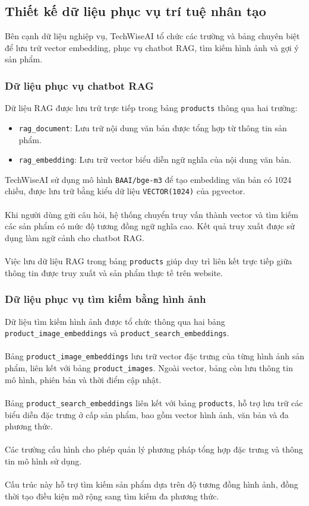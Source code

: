 \documentclass{report}
\begin{document}
\subsection{Thiết kế dữ liệu phục vụ trí tuệ nhân tạo}
Bên cạnh dữ liệu nghiệp vụ, TechWiseAI tổ chức các trường và bảng chuyên biệt để lưu trữ vector embedding, phục vụ chatbot RAG, tìm kiếm hình ảnh và gợi ý sản phẩm.

\subsubsection{Dữ liệu phục vụ chatbot RAG}
Dữ liệu RAG được lưu trữ trực tiếp trong bảng \texttt{products} thông qua hai trường:
\begin{itemize}
    \item \texttt{rag\_document}: Lưu trữ nội dung văn bản được tổng hợp từ thông tin sản phẩm.
    \item \texttt{rag\_embedding}: Lưu trữ vector biểu diễn ngữ nghĩa của nội dung văn bản.
\end{itemize}
TechWiseAI sử dụng mô hình \texttt{BAAI/bge-m3} để tạo embedding văn bản có 1024 chiều, được lưu trữ bằng kiểu dữ liệu \texttt{VECTOR(1024)} của pgvector.\\\\
Khi người dùng gửi câu hỏi, hệ thống chuyển truy vấn thành vector và tìm kiếm các sản phẩm có mức độ tương đồng ngữ nghĩa cao. Kết quả truy xuất được sử dụng làm ngữ cảnh cho chatbot RAG.\\\\
Việc lưu dữ liệu RAG trong bảng \texttt{products} giúp duy trì liên kết trực tiếp giữa thông tin được truy xuất và sản phẩm thực tế trên website.

\subsubsection{Dữ liệu phục vụ tìm kiếm bằng hình ảnh}
Dữ liệu tìm kiếm hình ảnh được tổ chức thông qua hai bảng \texttt{product\_image\_embeddings} và \texttt{product\_search\_embeddings}.\\\\
Bảng \texttt{product\_image\_embeddings} lưu trữ vector đặc trưng của từng hình ảnh sản phẩm, liên kết với bảng \texttt{product\_images}. Ngoài vector, bảng còn lưu thông tin mô hình, phiên bản và thời điểm cập nhật.\\\\
Bảng \texttt{product\_search\_embeddings} liên kết với bảng \texttt{products}, hỗ trợ lưu trữ các biểu diễn đặc trưng ở cấp sản phẩm, bao gồm vector hình ảnh, văn bản và đa phương thức.\\\\
Các trường cấu hình cho phép quản lý phương pháp tổng hợp đặc trưng và thông tin mô hình sử dụng.\\\\
Cấu trúc này hỗ trợ tìm kiếm sản phẩm dựa trên độ tương đồng hình ảnh, đồng thời tạo điều kiện mở rộng sang tìm kiếm đa phương thức.
\end{document}

